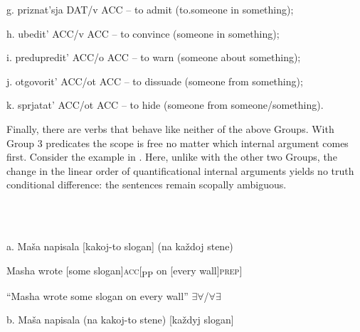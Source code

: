 \documentclass[output=paper,modfonts, nonflat]{langsci/langscibook}
\begin{document}
\begin{styleinnerExample}
  g.  priznat’sja DAT/v ACC – to admit (to.someone in something);
\end{styleinnerExample}

\begin{styleinnerExample}
  h.  ubedit’ ACC/v ACC – to convince (someone in something);
\end{styleinnerExample}

\begin{styleinnerExample}
  i.  predupredit’ ACC/o ACC – to warn (someone about something);
\end{styleinnerExample}

\begin{styleinnerExample}
  j.  otgovorit’ ACC/ot ACC – to dissuade (someone from something);
\end{styleinnerExample}

\begin{styleinnerExample}
  k.  sprjatat’ ACC/ot ACC – to hide (someone from someone/something).
\end{styleinnerExample}

Finally, there are verbs that behave like neither of the above Groups. With Group 3 predicates the scope is free no matter which internal argument comes first. Consider the example in . Here, unlike with the other two Groups, the change in the linear order of quantificational internal arguments yields no truth conditional difference: the sentences remain scopally ambiguous.

\begin{styleinnerExample}
\ea%
    \label{ex:key:17}
    \gll\\
        \\
    \glt
    \z

           a.  Maša   napisala [kakoj-to slogan]           (na  každoj stene)
\end{styleinnerExample}

\begin{styleinnerExample}
    Masha wrote     [some      slogan]\textsc{acc}[\textsubscript{PP} on [every  wall]\textsc{prep}]
\end{styleinnerExample}

\begin{styleinnerExample}
    “Masha wrote some slogan on every wall” ${\exists}{\forall}$/${\forall}{\exists}$
\end{styleinnerExample}

\begin{styleinnerExample}
  b.  Maša   napisala (na kakoj-to stene)         [každyj slogan]  
\end{styleinnerExample}
\end{document}

